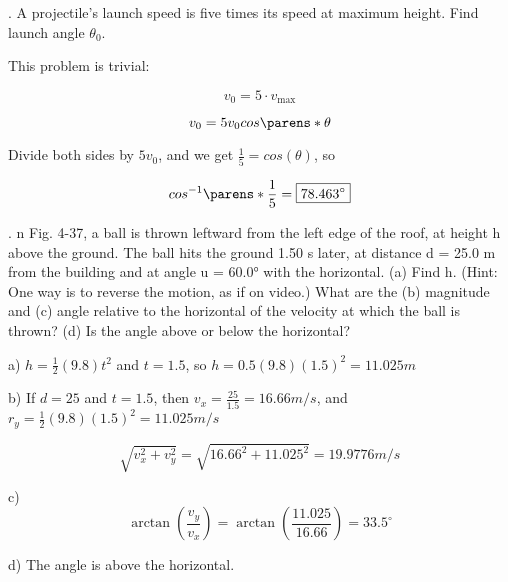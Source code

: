 \documentclass{scrreprt} %
\begin{document}
. A projectile's launch speed is five times its speed at maximum height.
Find launch angle $\theta_0$.

This problem is trivial:

$$v_0 = 5\cdot v_{\max}$$

$$v_0 = 5v_0cos\parens*{\theta}$$

Divide both sides by $5v_0$, and we get $\frac{1}{5}=cos(\theta)$, so

$$cos^{-1}\parens*{\frac{1}{5}} = \boxed{78.463^\circ}$$






. n Fig. 4-37, a ball is thrown leftward from the left edge of the
roof, at  height  h above  the  ground. The  ball  hits  the  ground  1.50 s
later, at distance d = 25.0 m from the building and at angle u = 60.0°
with  the  horizontal. (a)  Find  h.
(Hint: One way is to reverse the
motion, as  if  on  video.)  What
are  the  (b)  magnitude  and  (c)
angle  relative  to  the  horizontal
of the velocity at which the ball
is thrown? (d) Is the angle
above or below the horizontal? \newline


a) $h=\frac{1}{2}(9.8)t^2$ and $t = 1.5$, so $h = \boxed{0.5(9.8)(1.5)^2 = 11.025 m}$

b) If $d=25$ and $t=1.5$, then $v_x = \frac{25}{1.5} = 16.66 m/s$, and $r_y = \frac{1}{2}(9.8)(1.5)^2 = 11.025 m/s$

$$\sqrt{v_x^2 + v_y^2} = \sqrt{16.66^2 + 11.025^2} = \boxed{19.9776 m/s}$$

c) $$\arctan (\frac{v_y}{v_x}) = \arctan (\frac{11.025}{16.66}) = \boxed{33.5^\circ}$$

d) The angle is above the horizontal.
\end{document}
